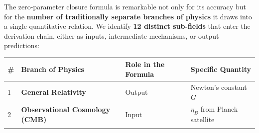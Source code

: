 \documentclass[
  11pt,
]{article}
\begin{document}
The zero-parameter closure formula is remarkable not only for its
accuracy but for the \textbf{number of traditionally separate branches
of physics} it draws into a single quantitative relation. We identify
\textbf{12 distinct sub-fields} that enter the derivation chain, either
as inputs, intermediate mechanisms, or output predictions:

\begin{longtable}[]{@{}llll@{}}
\toprule
\begin{minipage}[b]{0.04\columnwidth}\raggedright
\#\strut
\end{minipage} & \begin{minipage}[b]{0.27\columnwidth}\raggedright
Branch of Physics\strut
\end{minipage} & \begin{minipage}[b]{0.29\columnwidth}\raggedright
Role in the Formula\strut
\end{minipage} & \begin{minipage}[b]{0.29\columnwidth}\raggedright
Specific Quantity\strut
\end{minipage}\tabularnewline
\midrule
\endhead
\begin{minipage}[t]{0.04\columnwidth}\raggedright
1\strut
\end{minipage} & \begin{minipage}[t]{0.27\columnwidth}\raggedright
\textbf{General Relativity}\strut
\end{minipage} & \begin{minipage}[t]{0.29\columnwidth}\raggedright
Output\strut
\end{minipage} & \begin{minipage}[t]{0.29\columnwidth}\raggedright
Newton's constant \(G\)\strut
\end{minipage}\tabularnewline
\begin{minipage}[t]{0.04\columnwidth}\raggedright
2\strut
\end{minipage} & \begin{minipage}[t]{0.27\columnwidth}\raggedright
\textbf{Observational Cosmology (CMB)}\strut
\end{minipage} & \begin{minipage}[t]{0.29\columnwidth}\raggedright
Input\strut
\end{minipage} & \begin{minipage}[t]{0.29\columnwidth}\raggedright
\(\eta_B\) from Planck satellite\strut
\end{minipage}\tabularnewline
\begin{minipage}[t]{0.04\columnwidth}\raggedright

\end{minipage}
\end{longtable}
\end{document}
